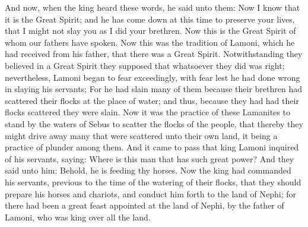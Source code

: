 And now, when the king heard these words, he said unto them: Now I know that it is the Great Spirit; and he has come down at this time to preserve your lives, that I might not slay you as I did your brethren. Now this is the Great Spirit of whom our fathers have spoken.
\bverse \iffalse Now this was the tradition of Lamoni, which he had received from his father, that there was a Great Spirit. Notwithstanding they believed in a Great Spirit they supposed that whatsoever they did was right; nevertheless, Lamoni began to fear exceedingly, with fear lest he had done wrong in slaying his servants; \fi
Now this was the tradition of Lamoni, which he had received from his father, that there was a Great Spirit. Notwithstanding they believed in a Great Spirit they supposed that whatsoever they did was right; nevertheless, Lamoni began to fear exceedingly, with fear lest he had done wrong in slaying his servants;
\bverse \iffalse For he had slain many of them because their brethren had scattered their flocks at the place of water; and thus, because they had had their flocks scattered they were slain. \fi
For he had slain many of them because their brethren had scattered their flocks at the place of water; and thus, because they had had their flocks scattered they were slain.
\bverse \iffalse Now it was the practice of these Lamanites to stand by the waters of Sebus to scatter the flocks of the people, that thereby they might drive away many that were scattered unto their own land, it being a practice of plunder among them. \fi
Now it was the practice of these Lamanites to stand by the waters of Sebus to scatter the flocks of the people, that thereby they might drive away many that were scattered unto their own land, it being a practice of plunder among them.
\bverse \iffalse And it came to pass that king Lamoni inquired of his servants, saying: Where is this man that has such great power? \fi
And it came to pass that king Lamoni inquired of his servants, saying: Where is this man that has such great power?
\bverse \iffalse And they said unto him: Behold, he is feeding thy horses. Now the king had commanded his servants, previous to the time of the watering of their flocks, that they should prepare his horses and chariots, and conduct him forth to the land of Nephi; for there had been a great feast appointed at the land of Nephi, by the father of Lamoni, who was king over all the land. \fi
And they said unto him: Behold, he is feeding thy horses. Now the king had commanded his servants, previous to the time of the watering of their flocks, that they should prepare his horses and chariots, and conduct him forth to the land of Nephi; for there had been a great feast appointed at the land of Nephi, by the father of Lamoni, who was king over all the land.
